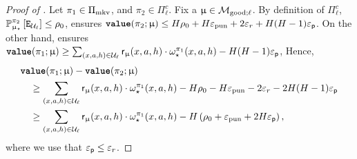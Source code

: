	\begin{proof}[Proof of ]

		Let $\pi_1 \in \Pimarkov$, and $\pi_2 \in \Pi_{\ell}^c$. Fix a $\model \in \modgoodl$. By definition of $\Pi_{\ell}^c$, $\Pr^{\pi_2}_{\modst}\left[ \Evisit \right] \le \rho_0$,   ensures $\valuef{\pi_2}{\model} \le H \rho_0 + H \epspunish + 2 \epsr + H(H-1)\epsp$. On the other hand,  ensures $\valuef{\pi_1}{\model}  \ge \sum_{(x,a,h) \in \calU_{\ell}} \sfr_{\model}\xah \cdot \omegast^{\pi_1}\xah - H(H-1)\epsp$, Hence,
		\begin{align*}
		&\valuef{\pi_1}{\model} - \valuef{\pi_2}{\model} \\
		&\quad\ge \sum_{(x,a,h) \in \calU_{\ell}} \sfr_{\model}\xah \cdot \omegast^{\pi_1}\xah -H \rho_0 - H \epspunish  - 2 \epsr -  2H(H-1)\epsp\\
		&\quad\ge \sum_{(x,a,h) \in \calU_{\ell}} \sfr_{\model}\xah \cdot \omegast^{\pi_1}\xah -H \left(\rho_0 + \epspunish  + 2H\epsp\right),
		\end{align*}
		where we  use that $\epsp \le \epsr$.
	\end{proof}

